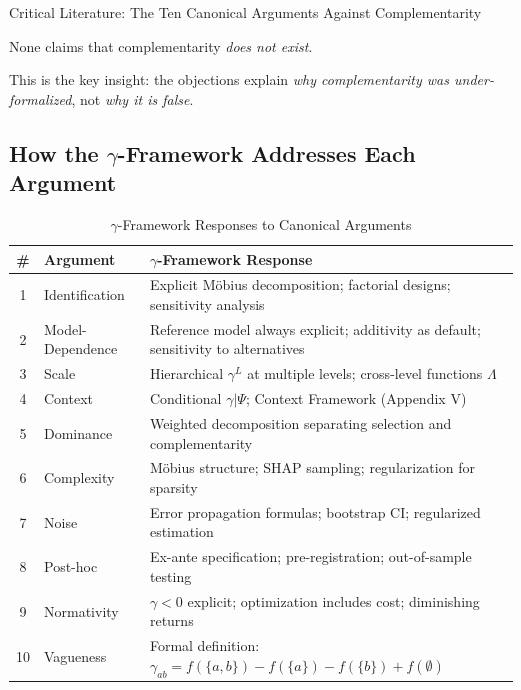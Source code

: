 \begin{chapter}{Critical Literature: The Ten Canonical Arguments Against Complementarity}
\begin{tcolorbox}[colback=green!5!white,colframe=green!75!black,title=\textbf{Central Finding}]
None claims that complementarity \textit{does not exist}.
\end{tcolorbox}

This is the key insight: the objections explain \textit{why complementarity was under-formalized}, not \textit{why it is false}.

\subsection{How the $\gamma$-Framework Addresses Each Argument}

\begin{table}[h]
\centering
\caption{$\gamma$-Framework Responses to Canonical Arguments}
\label{tab:gamma-responses}
\renewcommand{\arraystretch}{1.4}
\small
\begin{tabular}{@{}clp{6cm}@{}}
\toprule
\textbf{\#} & \textbf{Argument} & \textbf{$\gamma$-Framework Response} \\
\midrule
1 & Identification & Explicit Möbius decomposition; factorial designs; sensitivity analysis \\
2 & Model-Dependence & Reference model always explicit; additivity as default; sensitivity to alternatives \\
3 & Scale & Hierarchical $\gamma^L$ at multiple levels; cross-level functions $\Lambda$ \\
4 & Context & Conditional $\gamma|\Psi$; Context Framework (Appendix V) \\
5 & Dominance & Weighted decomposition separating selection and complementarity \\
6 & Complexity & Möbius structure; SHAP sampling; regularization for sparsity \\
7 & Noise & Error propagation formulas; bootstrap CI; regularized estimation \\
8 & Post-hoc & Ex-ante specification; pre-registration; out-of-sample testing \\
9 & Normativity & $\gamma < 0$ explicit; optimization includes cost; diminishing returns \\
10 & Vagueness & Formal definition: $\gamma_{ab} = f(\{a,b\}) - f(\{a\}) - f(\{b\}) + f(\emptyset)$ \\
\bottomrule
\end{tabular}
\end{table}


\end{chapter}
